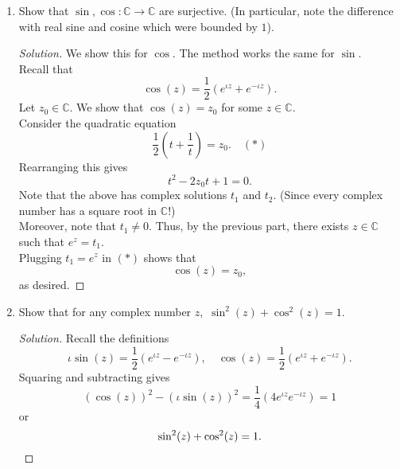 \documentclass[12pt]{article}
\theoremstyle{definition}
\numberwithin{thm}{section}
\newenvironment{soln}{\begin{proof}[Solution]}{\end{proof}}
\begin{document}
\begin{enumerate}
	\item Show that $\sin, \cos: \mathbb{C}\to\mathbb{C}$ are surjective. (In particular, note the difference with real sine and cosine which were bounded by $1$).
	\begin{soln}
		We show this for $\cos.$ The method works the same for $\sin.$\\
		Recall that
		\begin{equation*} 
			\cos(z) = \dfrac{1}{2}\left(e^{\iota z} + e^{-\iota z}\right).
		\end{equation*}
		Let $z_0 \in \mathbb{C}.$ We show that $\cos(z) = z_0$ for some $z \in \mathbb{C}.$\\
		Consider the quadratic equation
		\begin{equation*} 
			\dfrac{1}{2}\left(t + \dfrac{1}{t}\right) = z_0. \quad (*)
		\end{equation*}
		Rearranging this gives
		\begin{equation*} 
			t^2 - 2z_0t + 1 = 0.
		\end{equation*}
		Note that the above has complex solutions $t_1$ and $t_2.$ (Since every complex number has a square root in $\mathbb{C}$!)\\
		Moreover, note that $t_1 \neq 0.$ Thus, by the previous part, there exists $z \in \mathbb{C}$ such that $e^z = t_1.$\\
		Plugging $t_1 = e^z$ in $(*)$ shows that
		\begin{equation*} 
			\cos(z) = z_0,
		\end{equation*}
		as desired.	
	\end{soln}
	\item Show that for any complex number $z,$ $\sin^2(z) + \cos^2(z) = 1.$
	\begin{soln}
		Recall the definitions
		\begin{equation*} 
			\iota\sin(z) = \dfrac{1}{2}\left(e^{\iota z} - e^{-\iota z}\right), \quad \cos(z) = \dfrac{1}{2}\left(e^{\iota z} + e^{-\iota z}\right).
		\end{equation*}
		Squaring and subtracting gives
		\begin{equation*} 
			(\cos(z))^2 - (\iota\sin(z))^2 = \dfrac{1}{4}(4e^{\iota z}e^{-\iota z}) = 1
		\end{equation*}
		or
		\begin{equation*} 
			\sin^2(z) + \cos^2(z) = 1. \qedhere
		\end{equation*}
	\end{soln}
\end{enumerate}
\end{document}
